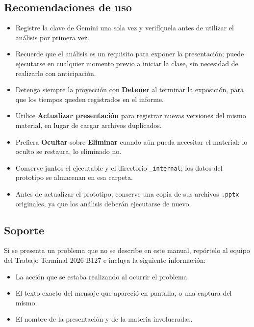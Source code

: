 \documentclass[11pt,letterpaper]{article}
\newcommand{\boton}[1]{\textbf{#1}}
\newcommand{\ruta}[1]{\texttt{#1}}
\newcommand{\carpetainterna}{\ruta{\_internal}}
\begin{document}
\subsection{Recomendaciones de uso}
\label{sec:recomendaciones}

\begin{itemize}
  \item Registre la clave de Gemini una sola vez y verifíquela antes de utilizar el análisis por primera vez.
  \item Recuerde que el análisis es un requisito para exponer la presentación; puede ejecutarse en cualquier momento previo a iniciar la clase, sin necesidad de realizarlo con anticipación.
  \item Detenga siempre la proyección con \boton{Detener} al terminar la exposición, para que los tiempos queden registrados en el informe.
  \item Utilice \boton{Actualizar presentación} para registrar nuevas versiones del mismo material, en lugar de cargar archivos duplicados.
  \item Prefiera \boton{Ocultar} sobre \boton{Eliminar} cuando aún pueda necesitar el material: lo oculto se restaura, lo eliminado no.
  \item Conserve juntos el ejecutable y el directorio \carpetainterna; los datos del prototipo se almacenan en esa carpeta.
  \item Antes de actualizar el prototipo, conserve una copia de sus archivos \ruta{.pptx} originales, ya que los análisis deberán ejecutarse de nuevo.
\end{itemize}

\subsection{Soporte}
\label{sec:soporte}

Si se presenta un problema que no se describe en este manual, repórtelo al equipo del Trabajo Terminal 2026-B127 e incluya la siguiente información:

\begin{itemize}
  \item La acción que se estaba realizando al ocurrir el problema.
  \item El texto exacto del mensaje que apareció en pantalla, o una captura del mismo.
  \item El nombre de la presentación y de la materia involucradas.
\end{itemize}
\end{document}

